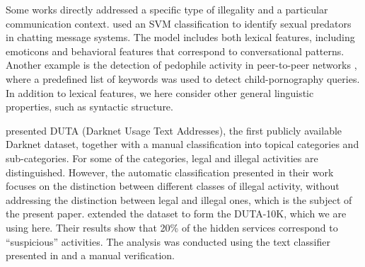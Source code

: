 \documentclass[11pt,a4paper,table]{article}
\newcommand{\oa}[1]{\footnote{\color{red}OA: #1}}
\begin{document}

Some works directly addressed a specific type of illegality and a particular communication context. \citet{MorrisHirst12} used an SVM classification to identify sexual predators in chatting message systems. The model includes both lexical features, including emoticons and behavioral features that correspond to conversational patterns. Another example is the detection of pedophile activity in peer-to-peer networks \citep{Latapy13}, where a predefined list of keywords was used to detect child-pornography queries. In addition to lexical features, we here consider other general linguistic properties, such as syntactic structure.%

\citet{AlNabki17} presented DUTA (Darknet Usage Text Addresses), the first publicly available Darknet dataset, together with a manual classification into topical categories and sub-categories. For some of the categories, legal and illegal activities are distinguished. However, the automatic classification presented in their work focuses on the distinction between different classes of illegal activity, without addressing the distinction between legal and illegal ones, which is the subject of the present paper. \citet{AlNabki19} extended the dataset to form the DUTA-10K, which we are using here. Their results show that 20\% of the hidden services correspond to ``suspicious'' activities. The analysis was conducted using the text classifier presented in \citet{AlNabki17} and a manual verification. %
\end{document}
